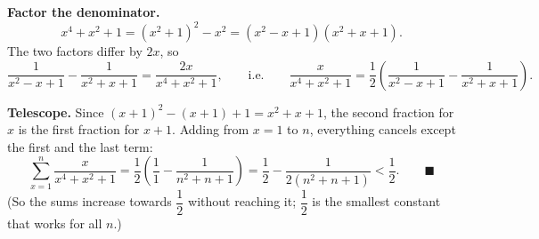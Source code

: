 \textbf{Factor the denominator.}
\[x^4+x^2+1=\left(x^2+1\right)^2-x^2=\left(x^2-x+1\right)\left(x^2+x+1\right).\]
The two factors differ by $2x$, so
\[\dfrac{1}{x^2-x+1}-\dfrac{1}{x^2+x+1}=\dfrac{2x}{x^4+x^2+1},\qquad\text{i.e.}\qquad\dfrac{x}{x^4+x^2+1}=\dfrac{1}{2}\left(\dfrac{1}{x^2-x+1}-\dfrac{1}{x^2+x+1}\right).\]

\textbf{Telescope.} Since $(x+1)^2-(x+1)+1=x^2+x+1$, the second fraction for $x$ is the first fraction for $x+1$. Adding from $x=1$ to $n$, everything cancels except the first and the last term:
\[\sum_{x=1}^{n}\dfrac{x}{x^4+x^2+1}=\dfrac{1}{2}\left(\dfrac{1}{1}-\dfrac{1}{n^2+n+1}\right)=\dfrac{1}{2}-\dfrac{1}{2\left(n^2+n+1\right)}<\dfrac{1}{2}.\qquad\blacksquare\]
(So the sums increase towards $\dfrac{1}{2}$ without reaching it; $\dfrac{1}{2}$ is the smallest constant that works for all $n$.)
